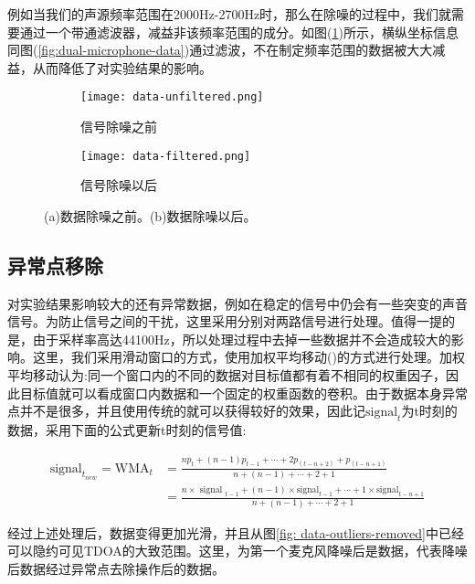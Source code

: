 \documentclass[winfonts]{njuthesis}
\begin{document}
			例如当我们的声源频率范围在2000Hz-2700Hz时，那么在除噪的过程中，我们就需要通过一个带通滤波器，减益非该频率范围的成分。如图(\ref{fig: filter-data})所示，横纵坐标信息同图(\ref{fig:dual-microphone-data})通过滤波，不在制定频率范围的数据被大大减益，从而降低了对实验结果的影响。
			
			\begin{figure}[ht!]
				\centering
				\begin{subfigure}{.45\textwidth}
					\centering
					\texttt{[image: data-unfiltered.png]}
					\caption{信号除噪之前}
				\end{subfigure}
				\begin{subfigure}{.45\textwidth}
					\centering
					\texttt{[image: data-filtered.png]}
					\caption{信号除噪以后}
				\end{subfigure}
				\caption{(a)数据除噪之前。(b)数据除噪以后。}
				\label{fig: filter-data}
			\end{figure}
					
		\subsection{异常点移除}
		
			对实验结果影响较大的还有异常数据，例如在稳定的信号中仍会有一些突变的声音信号。为防止信号之间的干扰，这里采用分别对两路信号进行处理。值得一提的是，由于采样率高达44100Hz，所以处理过程中去掉一些数据并不会造成较大的影响。这里，我们采用滑动窗口的方式，使用加权平均移动(\cite{Moving_average})的方式进行处理。加权平均移动认为:同一个窗口内的不同的数据对目标值都有着不相同的权重因子，因此目标值就可以看成窗口内数据和一个固定的权重函数的卷积。由于数据本身异常点并不是很多，并且使用传统的就可以获得较好的效果，因此记$\text{signal}_t$为t时刻的数据，采用下面的公式更新t时刻的信号值:
			
			\begin{equation}
			\begin{aligned}
				\text{signal}_{t_{new}} = \text{WMA}_{t}&=\frac{n p_{t}+(n-1) p_{t-1}+\cdots+2 p_{(t-n+2)}+p_{(t-n+1)}}{n+(n-1)+\cdots+2+1}\\
											  &=\frac{n \times \text { signal }_{t-1}+(n-1) \times \text {signal}_{t-1}+\cdots+1 \times \text {signal}_{t-n+1}}{n+(n-1)+\cdots+2+1}								 
			\end{aligned}
			\end{equation}
			
			经过上述处理后，数据变得更加光滑，并且从图\ref{fig: data-outliers-removed}中已经可以隐约可见TDOA的大致范围。这里，为第一个麦克风降噪后是数据，代表降噪后数据经过异常点去除操作后的数据。
			
\end{document}
